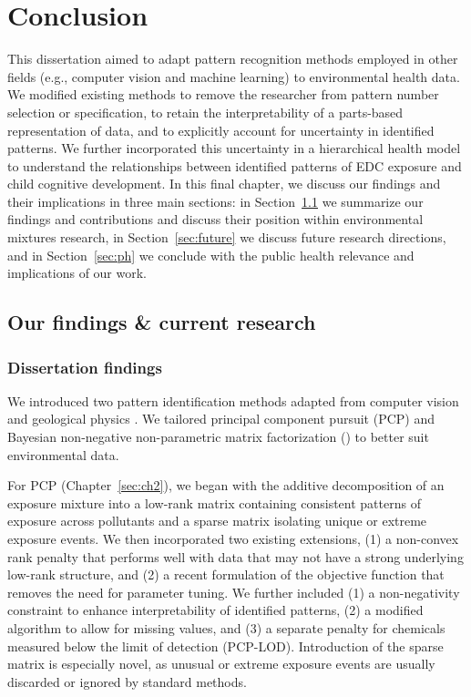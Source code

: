 \chapter{Conclusion}\label{sec:conclusion}
\clearpage
This dissertation aimed to adapt pattern recognition methods employed in other fields (e.g., computer vision and machine learning) to environmental health data. We modified existing methods to remove the researcher from pattern number selection or specification, to retain the interpretability of a parts-based representation of data, and to explicitly account for uncertainty in identified patterns. We further incorporated this uncertainty in a hierarchical health model to understand the relationships between identified patterns of EDC exposure and child cognitive development. In this final chapter, we discuss our findings and their implications in three main sections: in Section~\ref{sec:summarize} we summarize our findings and contributions and discuss their position within environmental mixtures research, in Section~\ref{sec:future} we discuss future research directions, and in Section~\ref{sec:ph} we conclude with the public health relevance and implications of our work.

\section{Our findings \& current research}\label{sec:summarize}

\subsection{Dissertation findings}\label{sec:findings}
We introduced two pattern identification methods adapted from computer vision and geological physics \citep{candes2011robust, zhou2010stable, holtzman2018machine}. We tailored principal component pursuit (PCP) and Bayesian non-negative non-parametric matrix factorization (\bnmfc) to better suit environmental data.

For PCP (Chapter~\ref{sec:ch2}), we began with the additive decomposition of an exposure mixture into a low-rank matrix containing consistent patterns of exposure across pollutants and a sparse matrix isolating unique or extreme exposure events. We then incorporated two existing extensions, (1) a non-convex rank penalty that performs well with data that may not have a strong underlying low-rank structure, and (2) a recent formulation of the objective function that removes the need for parameter tuning. We further included (1) a non-negativity constraint to enhance interpretability of identified patterns, (2) a modified algorithm to allow for missing values, and (3) a separate penalty for chemicals measured below the limit of detection (PCP-LOD). Introduction of the sparse matrix is especially novel, as unusual or extreme exposure events are usually discarded or ignored by standard methods.

